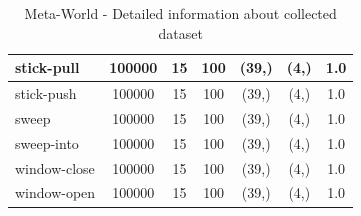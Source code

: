 \documentclass{article}
\theoremstyle{plain}
\theoremstyle{definition}
\theoremstyle{remark}
\begin{document}
\begin{table}[]
{\begin{tabular}{|l|c|c|c|c|c|c|}
stick-pull                          & 100000                                        & 15                                                   & 100                                             & (39,)                                           & (4,) & 1.0                                            \\ \hline
stick-push                          & 100000                                        & 15                                                   & 100                                             & (39,)                                           & (4,) & 1.0                                            \\ \hline
sweep                               & 100000                                        & 15                                                   & 100                                             & (39,)                                           & (4,) & 1.0                                            \\ \hline
sweep-into                          & 100000                                        & 15                                                   & 100                                             & (39,)                                           & (4,) & 1.0                                            \\ \hline
window-close                        & 100000                                        & 15                                                   & 100                                             & (39,)                                           & (4,) & 1.0                                            \\ \hline
window-open                         & 100000                                        & 15                                                   & 100                                             & (39,)                                           & (4,) & 1.0                                            \\ \hline
    \end{tabular}
}
    \caption{Meta-World - Detailed information about collected dataset}
    \label{dataset-info:metaworld}
\end{table}


\end{document}
